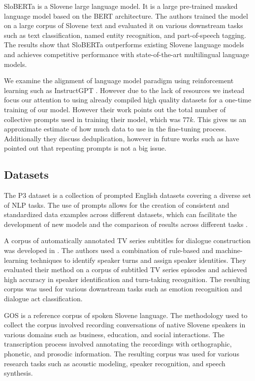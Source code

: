 \documentclass[fleqn,moreauthors,10pt]{ds_report}
\begin{document}
SloBERTa \cite{ulvcar2021sloberta} is a Slovene large language model. It is a large pre-trained masked language model based on the BERT architecture. The authors trained the model on a large corpus of Slovene text and evaluated it on various downstream tasks such as text classification, named entity recognition, and part-of-speech tagging. The results show that SloBERTa outperforms existing Slovene language models and achieves competitive performance with state-of-the-art multilingual language models. 

We examine the alignment of language model paradigm using reinforcement learning such as InstructGPT \cite{ouyang2022training}. However due to the lack of resources we instead focus our attention to using already compiled high quality datasets for a one-time training of our model. However their work points out the total number of collective prompts used in training their model, which was $77k$. This gives us an approximate estimate of how much data to use in the fine-tuning process. Additionally they discuss deduplication, however in future works such as \cite{alpaca} have pointed out that repeating prompts is not a big issue.

\subsection*{Datasets}
The P3 dataset is a collection of prompted English datasets covering a diverse set of NLP tasks. The use of prompts allows for the creation of consistent and standardized data examples across different datasets, which can facilitate the development of new models and the comparison of results across different tasks \cite{bach2022promptsource}. 

A corpus of automatically annotated TV series subtitles for dialogue construction was developed in \cite{tv_series_subtitles}. The authors used a combination of rule-based and machine-learning techniques to identify speaker turns and assign speaker identities. They evaluated their method on a corpus of subtitled TV series episodes and achieved high accuracy in speaker identification and turn-taking recognition. The resulting corpus was used for various downstream tasks such as emotion recognition and dialogue act classification.

GOS \cite{Verdonik2013} is a reference corpus of spoken Slovene language. The methodology used to collect the corpus involved recording conversations of native Slovene speakers in various domains such as business, education, and social interactions. The transcription process involved annotating the recordings with orthographic, phonetic, and prosodic information. The resulting corpus was used for various research tasks such as acoustic modeling, speaker recognition, and speech synthesis. 
\end{document}
